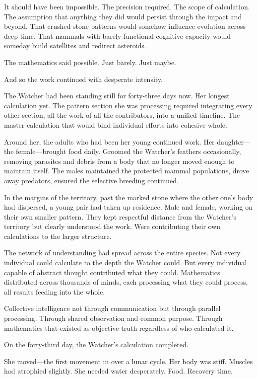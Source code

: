 It should have been impossible. The precision required. The scope of calculation. The assumption that anything they did would persist through the impact and beyond. That crushed stone patterns would somehow influence evolution across deep time. That mammals with barely functional cognitive capacity would someday build satellites and redirect asteroids.

The mathematics said possible. Just barely. Just maybe.

And so the work continued with desperate intensity.

\scenebreak

The Watcher had been standing still for forty-three days now. Her longest calculation yet. The pattern section she was processing required integrating every other section, all the work of all the contributors, into a unified timeline. The master calculation that would bind individual efforts into cohesive whole.

Around her, the adults who had been her young continued work. Her daughter—the female—brought food daily. Groomed the Watcher's feathers occasionally, removing parasites and debris from a body that no longer moved enough to maintain itself. The males maintained the protected mammal populations, drove away predators, ensured the selective breeding continued.

In the margins of the territory, past the marked stone where the other one's body had dispersed, a young pair had taken up residence. Male and female, working on their own smaller pattern. They kept respectful distance from the Watcher's territory but clearly understood the work. Were contributing their own calculations to the larger structure.

The network of understanding had spread across the entire species. Not every individual could calculate to the depth the Watcher could. But every individual capable of abstract thought contributed what they could. Mathematics distributed across thousands of minds, each processing what they could process, all results feeding into the whole.

Collective intelligence not through communication but through parallel processing. Through shared observation and common purpose. Through mathematics that existed as objective truth regardless of who calculated it.

On the forty-third day, the Watcher's calculation completed.

She moved—the first movement in over a lunar cycle. Her body was stiff. Muscles had atrophied slightly. She needed water desperately. Food. Recovery time.

